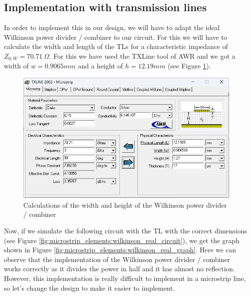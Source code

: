 \documentclass[12pt]{report} %
\begin{document}
\subsection{Implementation with transmission lines}

In order to implement this in our design, we will have to adapt the ideal Wilkinson power divider / combiner to our circuit. For this we will have to calculate the width and length of the TLs for a characteristic impedance of $Z_{0,W} = 70.71 \ \Omega$. For this we have used the TXLine tool of AWR and we got a width of $w = 0.9065 mm$ and a height of $h = 12.19 mm$ (see Figure \ref{fig:microstrip_elements:wilkinson_real_txline_tool_calculations}).

\begin{figure}[htbp]
    \centering
    \includegraphics[width=1\linewidth]{images//microstrip_elements/wilkinson_real_txline_tool_calculations.png}
    \caption{Calculations of the width and height of the Wilkinson power divider / combiner}
    \label{fig:microstrip_elements:wilkinson_real_txline_tool_calculations}
\end{figure}

Now, if we simulate the following circuit with the TL with the correct dimensions (see Figure \ref{fig:microstrip_elements:wilkinson_real_circuit}), we get the graph shown in Figure \ref{fig:microstrip_elements:wilkinson_real_graph}.
Here we can observe that the implementation of the Wilkinson power divider / combiner works correctly as it divides the power in half and it has almost no reflection. However, this implementation is really difficult to implement in a microstrip line, so let's change the design to make it easier to implement.
\end{document}
